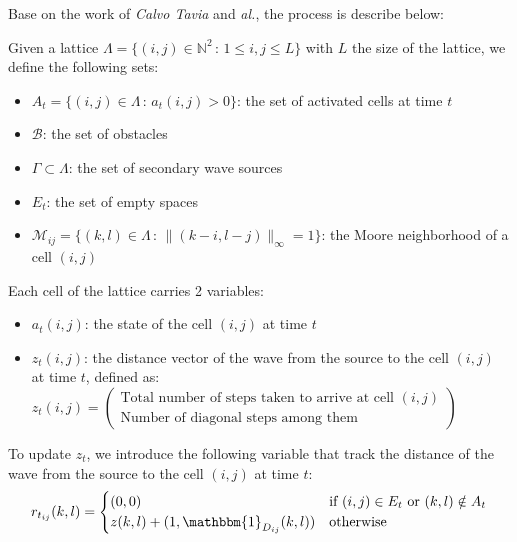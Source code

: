 \documentclass[../main.tex]{subfiles}
\begin{document}
\vspace{1em}

Base on the work of \textit{Calvo Tavia} and \textit{al.}\cite{tapia_2016}, the process is describe below:

\vspace{1em}

Given a lattice $\Lambda = \{(i,j) \in \mathbb{N}^{2} \,:\, 1 \leq i, j \leq L\}$ with $L$ the size of the lattice, we define the following sets:
\vspace{1em}

\begin{itemize}
	\item $A_t = \{ (i, j) \in \Lambda \,:\, a_t(i, j) > 0\}$: the set of activated cells at time $t$
	\item $\mathcal{B}$: the set of obstacles
	\item $\Gamma \subset \Lambda$: the set of secondary wave sources
	\item $E_t$: the set of empty spaces
	\item $\mathcal{M}_{ij} = \{ (k, l) \in \Lambda \,:\, \|(k - i, l - j)\|_{\infty} = 1\}$: the Moore neighborhood of a cell $(i, j)$
\end{itemize}

\vspace{1em}

Each cell of the lattice carries 2 variables:
\begin{itemize}
	\item $a_t (i, j)$: the state of the cell $(i, j)$ at time $t$
	\item $z_t (i, j)$: the distance vector of the wave from the source to the cell $(i, j)$ at time $t$, defined as:
	$z_t (i, j) = \begin{pmatrix}
		\text{Total number of steps taken to arrive at cell } (i, j) \\
		\text{Number of diagonal steps among them}
	\end{pmatrix}$
\end{itemize}


\vspace{1em}


To update $z_t$, we introduce the following variable that track the distance of the wave from the source to the cell $(i, j)$ at time $t$: 
$$r_{t_{ij}} (k, l) = \begin{cases}
	(0, 0) & \text{if } (i, j) \in {E}_{t} \text{ or } (k, l) \notin A_t\\
	z(k, l) + (1, \mathbbm{1}_{D_{ij}}(k, l)) & \text{otherwise}
\end{cases}$$
\end{document}
